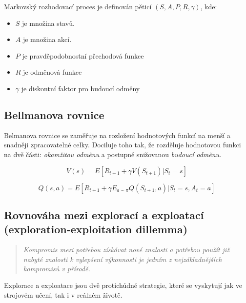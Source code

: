 \begin{definition}
  
Markovský rozhodovací proces je definován pěticí $(S, A, P, R, \gamma)$\cite{RL_basics}, kde:

\begin{itemize}
\item $S$ je množina stavů.
\item $A$ je množina akcí.
\item $P$ je pravděpodobnostní přechodová funkce
\item $R$ je odměnová funkce
\item $\gamma$ je diskontní faktor pro budoucí odměny
\end{itemize}
\end{definition}

\subsection{Bellmanova rovnice}\label{subsec:bellmanova-rovnice}

Belmanova rovnice se zaměřuje na rozložení hodnotových funkcí na menší a snadněji zpracovatelné celky.
Dociluje toho tak, že rozděluje hodnotovou funkci na dvě části: \emph{okamžitou odměnu} a postupně snižovanou \emph{budoucí odměnu}.

\begin{equation}
  V(s) = E[R_{t+1} + \gamma V(S_{t+1}) | S_t = s]\label{eq:bellman1}
\end{equation}

\begin{equation}
  Q(s, a) = E[R_{t+1} + \gamma E_{a\sim\pi}Q(S_{t+1}, a) | S_t = s, A_t = a]\label{eq:bellman2}
\end{equation}



\subsection{Rovnováha mezi explorací a exploatací (exploration-exploitation dillemma)}
\label{subsec:exploration-exploitation-dillemma}
\begin{quote}
  \emph{Kompromis mezi potřebou získávat nové znalosti a potřebou použít již nabyté znalosti k vylepšení výkonnosti je jedním z nejzákladnějších kompromisů v přírodě.~\cite{Exploitation_Exploration}}
\end{quote}
Explorace a exploatace jsou dvě protichůdné strategie, které se vyskytují jak ve strojovém učení, tak i v reálném životě.

